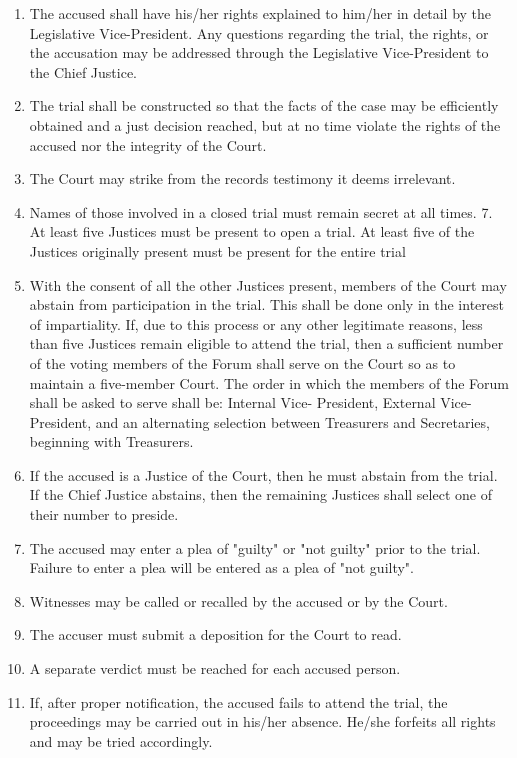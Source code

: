 \documentclass[11pt]{amsart}
\begin{document}
\begin{enumerate}
\begin{enumerate}
\begin{enumerate}
			\item The accused shall have his/her rights explained to him/her in detail by the Legislative Vice-President. Any questions regarding the trial, the rights, or the accusation may be addressed through the Legislative Vice-President to the Chief Justice.
			\item The trial shall be constructed so that the facts of the case may be efficiently obtained and a just decision reached, but at no time violate the rights of the accused nor the integrity of the Court.
			\item The Court may strike from the records testimony it deems irrelevant.
			\item Names of those involved in a closed trial must remain secret at all times. 7. At least five Justices must be present to open a trial. At least five of the Justices originally present must be present for the entire trial
			\item With the consent of all the other Justices present, members of the Court may abstain from participation in the trial. This shall be done only in the interest of impartiality. If, due to this process or any other legitimate
reasons, less than five Justices remain eligible to attend the trial, then a sufficient number of the voting members of the Forum shall serve on the Court so as to maintain a five-member Court. The order in which the members of the Forum shall be asked to serve shall be: Internal Vice- President, External Vice-President, and an alternating selection between Treasurers and Secretaries, beginning with Treasurers.
			\item If the accused is a Justice of the Court, then he must abstain from the trial. If the Chief Justice abstains, then the remaining Justices shall select one of their number to preside.
			\item The accused may enter a plea of "guilty" or "not guilty" prior to the trial. Failure to enter a plea will be entered as a plea of "not guilty".
			\item Witnesses may be called or recalled by the accused or by the Court.
			\item The accuser must submit a deposition for the Court to read.
			\item A separate verdict must be reached for each accused person.
			\item If, after proper notification, the accused fails to attend the trial, the proceedings may be carried out in his/her absence. He/she forfeits all rights and may be tried accordingly.

\end{enumerate}
\end{enumerate}
\end{enumerate}
\end{document}
